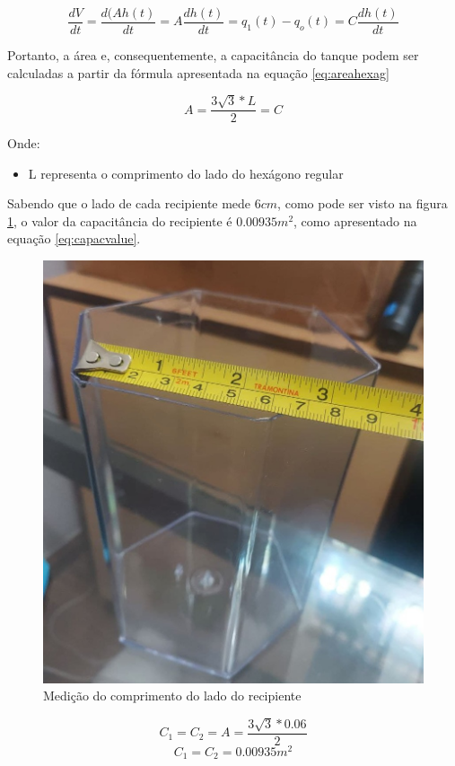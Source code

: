 \documentclass[a4paper,11pt]{article}
\begin{document}
\begin{equation}
    \frac{dV}{dt} = \frac{d(Ah(t)}{dt} = A \frac{dh(t)}{dt} = q_1(t) - q_o(t) = C \frac{dh(t)}{dt}
    \label{eq:capac-area}
\end{equation}

Portanto, a área e, consequentemente, a capacitância do tanque podem ser calculadas a partir da fórmula apresentada na equação \ref{eq:areahexag}

\begin{equation}
    A = \frac{3 \sqrt{3} * L}{2} = C
    \label{eq:areahexag}
\end{equation}

Onde:

\begin{itemize}
    \item L representa o comprimento do lado do hexágono regular
\end{itemize}

Sabendo que o lado de cada recipiente mede $6cm$, como pode ser visto na figura \ref{fig:ladorecip}, o valor da capacitância do recipiente é $0.00935 m^2$, como apresentado na equação \ref{eq:capacvalue}.

    \begin{figure}[H]
        \centering
        \includegraphics[width=0.5\linewidth]{img/1modelagem/lado-recipiente.jpg}
        \caption{Medição do comprimento do lado do recipiente}
        \label{fig:ladorecip}
    \end{figure}

\begin{equation*}
    C_1 = C_2 = A = \frac{3 \sqrt{3} * 0.06}{2}
\end{equation*}
\begin{equation}
    C_1 = C_2 = 0.00935 m^2
    \label{eq:capacvalue}
\end{equation}
\end{document}
